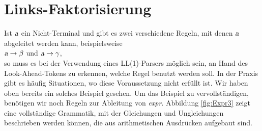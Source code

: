 \section{Links-Faktorisierung}
Ist $\textsl{a}$ ein Nicht-Terminal
und gibt es zwei verschiedene Regeln, mit denen $\textsl{a}$ abgeleitet werden kann, beispielsweise
\\[0.2cm]
\hspace*{1.3cm}
$\textsl{a} \rightarrow \beta$ \quad und \quad $\textsl{a} \rightarrow \gamma$,
\\[0.2cm]
so muss es bei der Verwendung eines LL(1)-Parsers möglich sein, an Hand des Look-Ahead-Tokens zu
erkennen, welche Regel benutzt werden soll.  In der Praxis gibt es häufig Situationen, wo
diese Voraussetzung nicht erfüllt ist.  Wir haben oben bereits ein solches Beispiel
gesehen.  Um das Beispiel zu vervollständigen, benötigen wir noch Regeln zur Ableitung von
\textsl{expr}.  Abbildung \ref{fig:Expr3} zeigt eine vollständige Grammatik, mit der
Gleichungen und Ungleichungen beschrieben werden können, die aus arithmetischen Ausdrücken
aufgebaut sind.


